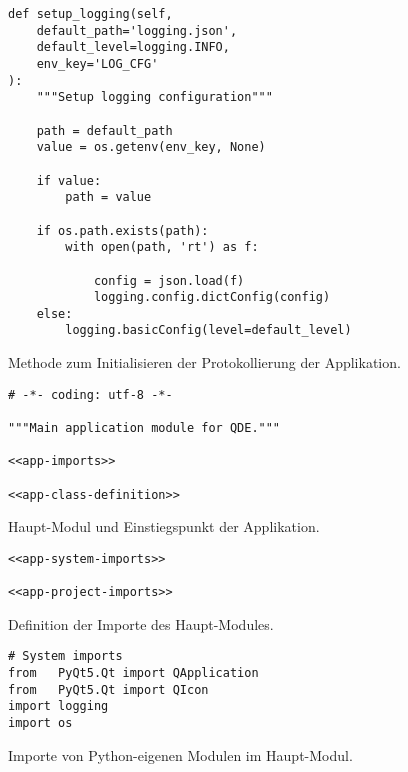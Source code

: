 \documentclass[10pt, openright, notitlepage]{scrreprt}
\begin{document}
\begin{listing}[H]
\begin{verbatim}
def setup_logging(self,
    default_path='logging.json',
    default_level=logging.INFO,
    env_key='LOG_CFG'
):
    """Setup logging configuration"""

    path = default_path
    value = os.getenv(env_key, None)

    if value:
        path = value

    if os.path.exists(path):
        with open(path, 'rt') as f:

            config = json.load(f)
            logging.config.dictConfig(config)
    else:
        logging.basicConfig(level=default_level)
\end{verbatim}
\caption{\label{orge44e6fc}
Methode zum Initialisieren der Protokollierung der Applikation.}
\end{listing}


\begin{listing}[H]
\begin{verbatim}
# -*- coding: utf-8 -*-

"""Main application module for QDE."""

<<app-imports>>

<<app-class-definition>>
\end{verbatim}
\caption{Haupt-Modul und Einstiegspunkt der Applikation.}
\end{listing}

\begin{listing}[H]
\begin{verbatim}
<<app-system-imports>>

<<app-project-imports>>
\end{verbatim}
\caption{\label{orgf9a0a9c}
Definition der Importe des Haupt-Modules.}
\end{listing}

\begin{listing}[H]
\begin{verbatim}
# System imports
from   PyQt5.Qt import QApplication
from   PyQt5.Qt import QIcon
import logging
import os
\end{verbatim}
\caption{\label{org64b0c17}
Importe von Python-eigenen Modulen im Haupt-Modul.}
\end{listing}
\end{document}

